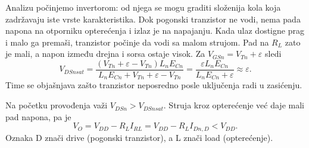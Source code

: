 Analizu počinjemo invertorom: od njega se mogu graditi složenija kola koja zadržavaju iste vrste karakteristika. Dok pogonski tranzistor ne vodi, nema pada napona na otporniku opterećenja i izlaz je na napajanju. Kada ulaz dostigne prag i malo ga premaši, tranzistor počinje da vodi sa malom strujom. Pad na $R_L$ zato je mali, a napon između drejna i sorsa ostaje visok. Za $V_{GSn}=V_{Tn}+\varepsilon$ sledi
\[V_{DSnsat}=\frac{(V_{Tn}+\varepsilon-V_{Tn})L_nE_{Cn}}{L_nE_{Cn}+V_{Tn}+\varepsilon-V_{Tn}}=\frac{\varepsilon L_nE_{Cn}}{L_nE_{Cn}+\varepsilon}\approx\varepsilon.\]
Time se objašnjava zašto tranzistor neposredno posle uključenja radi u zasićenju.

\par Na početku provođenja važi $V_{DSn}>V_{DSnsat}$. Struja kroz opterećenje već daje mali pad napona, pa je
\[V_O=V_{DD}-R_LI_{RL}=V_{DD}-R_LI_{Dn,D}<V_{DD}.\]
Oznaka D znači drive (pogonski tranzistor), a L znači load (opterećenje).
